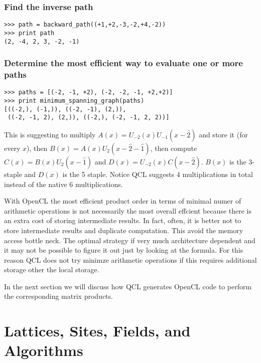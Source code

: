 \documentclass[12pt]{article}
\begin{document}
\subsubsection*{Find the inverse path}
\begin{lstlisting}
>>> path = backward_path((+1,+2,-3,-2,+4,-2))
>>> print path
(2, -4, 2, 3, -2, -1)
\end{lstlisting}

\subsubsection*{Determine the most efficient way to evaluate one or more paths}
\begin{lstlisting}
>>> paths = [(-2, -1, +2), (-2, -2, -1, +2,+2)]
>>> print minimum_spanning_graph(paths)
[((-2,), (-1,)), ((-2, -1), (2,)),
 ((-2, -1, 2), (2,)), ((-2,), (-2, -1, 2, 2))]
\end{lstlisting}
This is suggesting to multiply $A(x) = U_{-2}(x)U_{-1}(x-\hat{2})$ and store it (for every $x$), then $B(x) = A(x)U_{2}(x-\hat{2}-\hat{1})$, then compute $C(x) = B(x)U_{2}(x-\hat{1})$ and $D(x)=U_{-2}(x) C(x-\hat{2})$. $B(x)$ is the 3-staple and $D(x)$ is the 5 staple. Notice QCL suggests 4 multiplications in total instead of the native 6 multiplications.

With OpenCL the most efficient product order in terms of minimal numer of arithmetic operations is not necessarily the most overall effcient because there is an extra cost of storing intermediate results. In fact, often, it is better not to store intermediate results and duplicate computation. This avoid the memory access bottle neck. The optimal strategy if very much architecture dependent and it may not be possible to figure it out just by looking at the formula. For this reason QCL does not try minimze arithmetic operations if this requires additional storage other the local storage.

In the next section we will discuss how QCL generates OpenCL code to perform the corresponding matrix products.

\section{Lattices, Sites, Fields, and Algorithms}
\end{document}
